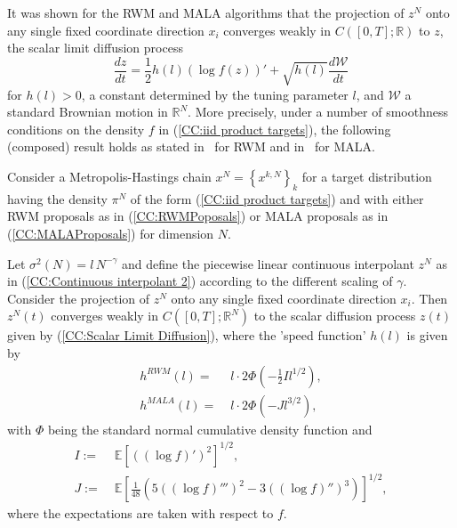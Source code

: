 It was shown for the RWM and MALA algorithms that the projection of $z^{N}$ onto any single fixed coordinate direction $x_i$ converges weakly in $ C \left( [0,T];\mathbb{R} \right) $ to $z$, the scalar limit diffusion process
\begin{equation}
 \label{CC:Scalar Limit Diffusion}
 \frac{dz}{dt} = \frac{1}{2} h(l) \left( \log f(z) \right)' + \sqrt{h(l)}\frac{d\mathcal{W}}{dt}
\end{equation}
for $ h(l) > 0 $, a constant determined by the tuning parameter $l$, and $ \mathcal{W} $ a standard Brownian motion in $ \mathbb{R}^{N} $.
More precisely, under a number of smoothness conditions on the density $f$ in (\ref{CC:iid product targets}), the following (composed) result holds as stated in~\autocite{Roberts1997} for RWM and in~\autocite{Roberts1998} for MALA.

\begin{thm}
 \label{CC: Product Diffusion Limit Result}
 
 Consider a Metropolis-Hastings chain $ x^{N} = \left\{  x^{k,N} \right\}_{k} $ for a target distribution having the density $ \pi^{N} $ of the form (\ref{CC:iid product targets}) and with either RWM proposals as in (\ref{CC:RWMPoposals}) or MALA proposals as in (\ref{CC:MALAProposals}) for dimension $N$.
 
 Let $ \sigma^2 (N) = l\,N^{-\gamma}$ and define the piecewise linear continuous interpolant $z^{N}$  as in (\ref{CC:Continuous interpolant 2}) according to the different scaling of $\gamma$. Consider the projection of $z^{N}$ onto any single fixed coordinate direction $x_i$. Then $z^{N}(t)$ converges weakly in $ C \left( [0,T]; \mathbb{R}^{N}\right) $ to the scalar diffusion process $z(t)$ given by (\ref{CC:Scalar Limit Diffusion}), where the 'speed function' $h(l)$ is given by
 \begin{align}
  h^{RWM}(l) = & \; l \cdot 2 \Phi \left( - \frac{1}{2} I l^{1/2} \right), \\
  h^{MALA}(l) = & \; l \cdot 2 \Phi \left( - J l^{3/2} \right),
 \end{align}
 with $\Phi$ being the standard normal cumulative density function and
 \begin{align}
  I := & \; \mathbb{E} \left[ \left( \left( \log f \right)' \right)^2  \right]^{1/2}, \\
  J := & \; \mathbb{E} \left[ \frac{1}{48} \left( 5 \left( \left( \log f \right)''' \right)^2 - 3 \left( \left( \log f \right)'' \right)^3 \right) \right]^{1/2},
 \end{align}
 where the expectations are taken with respect to $f$.
 
\end{thm}

